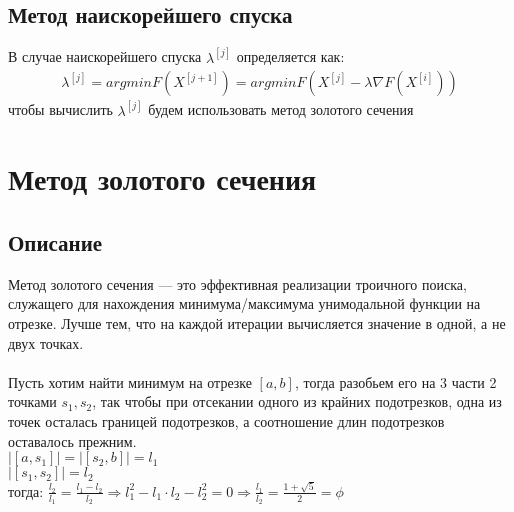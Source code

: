 \documentclass{article}
\begin{document}
    \subsection{Метод наискорейшего спуска}
    В случае наискорейшего спуска $\lambda^{[j]}$ определяется как:\\
    \begin{gather*}
        \lambda^{[j]}=argmin F(X^{[j+1]}) = argmin F(X^{[j]} - \lambda\nabla F(X^{[i]}))
    \end{gather*}
    чтобы вычислить $\lambda^{[j]}$ будем использовать метод золотого сечения




































    \newpage


    \section{Метод золотого сечения}

    \subsection{Описание}

    Метод золотого сечения — это эффективная реализации троичного поиска, служащего для нахождения минимума/максимума унимодальной функции на отрезке. Лучше тем, что на каждой итерации вычисляется значение в одной, а не двух точках.\\\\
    Пусть хотим найти минимум на отрезке $[a, b]$, тогда разобьем его на 3 части 2 точками $s_1, s_2$, так чтобы при отсекании одного из крайних подотрезков, одна из точек осталась границей подотрезков, а соотношение длин подотрезков оставалось прежним.\\
    $|[a, s_1]|=|[s_2, b]|=l_1$\\
    $|[s_1, s_2]|=l_2$\\
    тогда: $\frac{l_2}{l_1}=\frac{l_1-l_2}{l_2} \Rightarrow l_1^2-l_1\cdot{l_2}-l_2^2=0 \Rightarrow \frac{l_1}{l_2}=\frac{1+\sqrt{5}}{2}=\phi$
\end{document}
